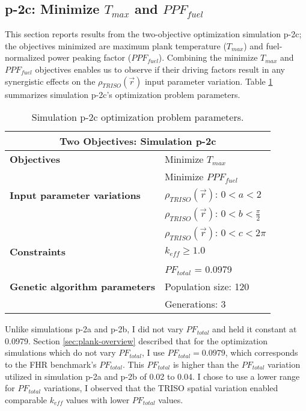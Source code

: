 \subsection{p-2c: Minimize $T_{max}$ and $PPF_{fuel}$}
\label{sec:p-2c}
This section reports results from the two-objective optimization simulation p-2c; the 
objectives minimized are maximum plank temperature ($T_{max}$) and fuel-normalized 
power peaking factor ($PPF_{fuel}$).  
Combining the minimize $T_{max}$ and $PPF_{fuel}$ objectives enables us to observe if 
their driving factors result in any synergistic effects on the
$\rho_{TRISO}(\vec{r})$ input parameter variation. 
Table \ref{tab:simulationp2c} summarizes simulation p-2c's optimization problem parameters. 
\begin{table}[htbp!]
    \centering
    \onehalfspacing
    \caption{Simulation p-2c optimization problem parameters.}
	\label{tab:simulationp2c}
    \footnotesize
    \begin{tabular}{l|p{4cm}}
    \hline 
    \multicolumn{2}{c}{\textbf{Two Objectives: Simulation p-2c}} \\
    \hline 
    \textbf{Objectives} & Minimize $T_{max}$ \\
    & Minimize $PPF_{fuel}$ \\
    \hline 
    \textbf{Input parameter variations} 
    & $\rho_{TRISO}(\vec{r})$: $0<a<2$ \\
    & $\rho_{TRISO}(\vec{r})$: $0<b<\frac{\pi}{2}$ \\
    & $\rho_{TRISO}(\vec{r})$: $0<c<2\pi$ \\
    \hline
    \textbf{Constraints} & $k_{eff} \geq 1.0$\\ 
    & $PF_{total}$ = 0.0979\\
    \hline 
    \textbf{Genetic algorithm parameters} & Population size: 120 \\
    & Generations: 3 \\
    \hline
    \end{tabular}
\end{table}
Unlike simulations p-2a and p-2b, I did not vary $PF_{total}$ and held it constant at 
0.0979. 
Section \ref{sec:plank-overview} described that for the optimization simulations which 
do not vary $PF_{total}$, I use $PF_{total} = 0.0979$, which corresponds to the 
\gls{FHR} benchmark's $PF_{total}$.  
This $PF_{total}$ is higher than the $PF_{total}$ variation utilized in simulation p-2a 
and p-2b of 0.02 to 0.04. 
I chose to use a lower range for $PF_{total}$ variations, I observed that the TRISO 
spatial variation enabled comparable $k_{eff}$ values with lower $PF_{total}$ values. 


